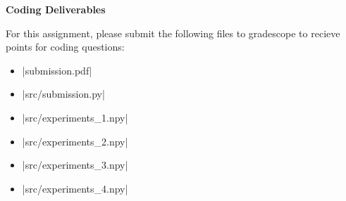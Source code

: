 \begin{enumerate}
	
    
    
\end{enumerate}

\textbf{Coding Deliverables}

For this assignment, please submit the following files to gradescope to recieve points for coding questions:
\begin{itemize}
    \item |submission.pdf|
    \item |src/submission.py|
    \item |src/experiments_1.npy|
    \item |src/experiments_2.npy|
    \item |src/experiments_3.npy|
    \item |src/experiments_4.npy|
\end{itemize}
